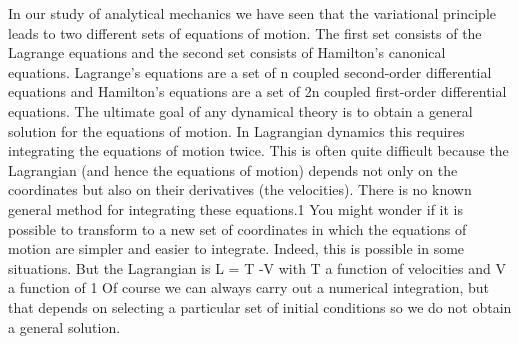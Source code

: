 In our study of analytical mechanics we have seen that the variational principle leads to two different sets of equations of motion. The first set consists
of the Lagrange equations and the second set consists of Hamilton's canonical
equations. Lagrange's equations are a set of n coupled second-order differential equations and Hamilton's equations are a set of 2n coupled first-order
differential equations.
The ultimate goal of any dynamical theory is to obtain a general solution for
the equations of motion. In Lagrangian dynamics this requires integrating the
equations of motion twice. This is often quite difficult because the Lagrangian
(and hence the equations of motion) depends not only on the coordinates but
also on their derivatives (the velocities). There is no known general method
for integrating these equations.1 You might wonder if it is possible to transform to a new set of coordinates in which the equations of motion are simpler and easier to integrate. Indeed, this is possible in some situations. But the
Lagrangian is L = T -V with T a function of velocities and V a function of
1 Of course we can always carry out a numerical integration, but that depends on selecting a
particular set of initial conditions so we do not obtain a general solution.